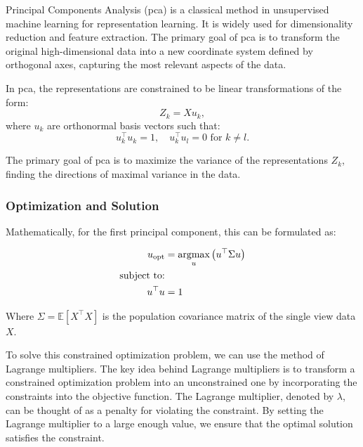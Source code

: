 Principal Components Analysis \citep{hotelling1933analysis} (\acrshort{pca}) is a classical method in unsupervised machine learning for representation learning.
It is widely used for dimensionality reduction and feature extraction.
The primary goal of \acrshort{pca} is to transform the original high-dimensional data into a new coordinate system defined by orthogonal axes, capturing the most relevant aspects of the data.

In \acrshort{pca}, the \gls{representations} are constrained to be linear transformations of the form:
\begin{equation}
    \label{eq:pca-linear-function-def}
    Z_k = X u_k,
\end{equation}
where $u_k$ are orthonormal basis vectors such that:
\begin{equation}
    \label{eq:pca-orthonormality-constraint}
    u_k^\top u_k = 1, \quad
    u_k^\top u_l = 0 \text{ for } k \neq l.
\end{equation}

The primary goal of \acrshort{pca} is to maximize the variance of the \gls{representations} \(Z_k\), finding the directions of maximal variance in the data.

\subsubsection{Optimization and Solution}
Mathematically, for the first principal component, this can be formulated as:

\begin{align}
    u_{\text{opt}} & = \underset{u}{\text{argmax}} \left( u^\top \Sigma u \right) \\
    \text{subject to:} \notag                                                     \\
    u^\top u& = 1 \notag
\end{align}

Where \(\Sigma = \mathbb{E}[X^\top X]\) is the population \gls{covariance matrix} of the single view data $X$.

To solve this constrained optimization problem, we can use the method of Lagrange multipliers. The key idea behind Lagrange multipliers is to transform a constrained optimization problem into an unconstrained one by incorporating the constraints into the objective function. The Lagrange multiplier, denoted by $\lambda$, can be thought of as a penalty for violating the constraint. By setting the Lagrange multiplier to a large enough value, we ensure that the optimal solution satisfies the constraint.

